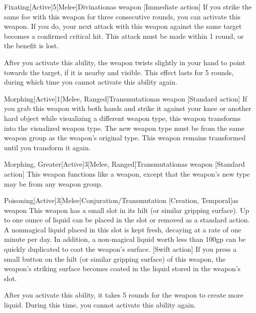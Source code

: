             \begin{magicitemdef}{Fixating}[Active]{5}[Melee]{Divination}{as weapon}
                [Immediate action] If you strike the same foe with this weapon for three consecutive rounds, you can activate this weapon.
                If you do, your next attack with this weapon against the same target becomes a confirmed critical hit.
                This attack must be made within 1 round, or the benefit is lost.

                After you activate this ability, the weapon twists slightly in your hand to point towards the target, if it is nearby and visible.
                This effect lasts for 5 rounds, during which time you cannot activate this ability again.
            \end{magicitemdef}

            \begin{magicitemdef}{Morphing}[Active]{1}[Melee, Ranged]{Transmutation}{as weapon}
                [Standard action] If you grab this weapon with both hands and strike it against your knee or another hard object while visualizing a different weapon type, this weapon transforms into the visualized weapon type.
                The new weapon type must be from the same weapon group as the weapon's original type.
                This weapon remains transformed until you transform it again.
            \end{magicitemdef}

            \begin{magicitemdef}{Morphing, Greater}[Active]{3}[Melee, Ranged]{Transmutation}{as weapon}
                [Standard action] This weapon functions like a  weapon, except that the weapon's new type may be from any weapon group.
            \end{magicitemdef}

            \begin{magicitemdef}{Poisoning}[Active]{3}[Melee]{Conjuration/Transmutation [Creation, Temporal]}{as weapon}
                 This weapon has a small slot in its hilt (or similar gripping surface). Up to one ounce of liquid can be placed in the slot or removed as a standard action. A nonmagical liquid placed in this slot is kept fresh, decaying at a rate of one minute per day. In addition, a non-magical liquid worth less than 100gp can be quickly duplicated to coat the weapon's surface.
                [Swift action] If you press a small button on the hilt (or similar gripping surface) of this weapon, the weapon's striking surface becomes coated in the liquid stored in the weapon's slot.

                After you activate this ability, it takes 5 rounds for the weapon to create more liquid.
                During this time, you cannot activate this ability again.
            \end{magicitemdef}

